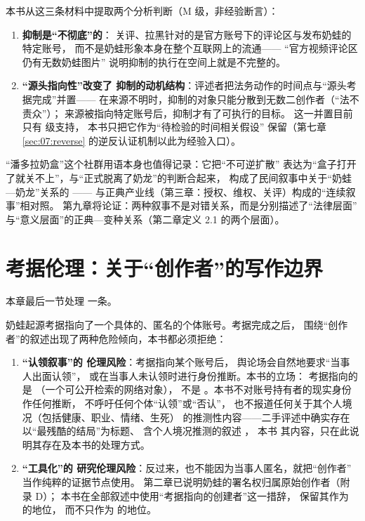 本书从这三条材料中提取两个分析判断（M 级，非经验断言）：

\begin{enumerate}[label=\arabic*.]
  \item \textbf{抑制是“不彻底”的}：
关评、拉黑针对的是官方账号下的评论区与发布奶蛙的特定账号，
 而不是奶蛙形象本身在整个互联网上的流通——
 “官方视频评论区仍有无数奶蛙图片”
 说明抑制的执行在空间上就是不完整的。
  \item \textbf{“源头指向性”改变了
抑制的动机结构}：评述者把法务动作的时间点与“源头考据完成”并置——
 在来源不明时，抑制的对象只能分散到无数二创作者（“法不责众”）；
 来源被指向特定账号后，抑制才有了可执行的目标。
 这一并置目前只有  级支持，
 本书只把它作为“待检验的时间相关假设”
 保留（第七章 \ref{sec:07:reverse} 的逆反认证机制以此为经验入口）。
\end{enumerate}

“潘多拉奶盒”这个社群用语本身也值得记录：它把“不可逆扩散”
 表达为“盒子打开了就关不上”，与“正式脱离了奶龙”的判断合起来，
 构成了民间叙事中关于“奶蛙—奶龙”关系的 ——
 与正典产业线（第三章：授权、维权、关评）构成的“连续叙事”相对照。
 第九章将论证：两种叙事不是对错关系，而是分别描述了“法律层面”
 与“意义层面”的正典—变种关系（第二章定义 2.1 的两个层面）。

\section{考据伦理：关于“创作者”的写作边界}\label{sec:04:ethics}

本章最后一节处理
一条。

奶蛙起源考据指向了一个具体的、匿名的个体账号。考据完成之后，
 围绕“创作者”的叙述出现了两种危险倾向，本书都必须拒绝：

\begin{enumerate}[label=\arabic*.]
  \item \textbf{“认领叙事”的
伦理风险}：考据指向某个账号后，
 舆论场会自然地要求“当事人出面认领”，
 或在当事人未认领时进行身份推断。本书的立场：
 考据指向的是  （一个可公开检索的网络对象），
 不是 。本书不对账号持有者的现实身份作任何推断，
 不呼吁任何个体“认领”或“否认”，
 也不报道任何关于其个人境况（包括健康、职业、情绪、生死）
 的推测性内容——二手评述中确实存在以“最残酷的结局”为标题、
 含个人境况推测的叙述  \cite{shoutanji2026naiwa}，
 本书  其内容，只在此说明其存在及本书的处理方式。
  \item \textbf{“工具化”的
研究伦理风险}：反过来，也不能因为当事人匿名，就把“创作者”
 当作纯粹的证据节点使用。
 第二章已说明奶蛙的署名权归属原始创作者（附录 D）；
 本书在全部叙述中使用“考据指向的创建者”这一措辞，
 保留其作为  的地位，
 而不只作为  的地位。
\end{enumerate}

